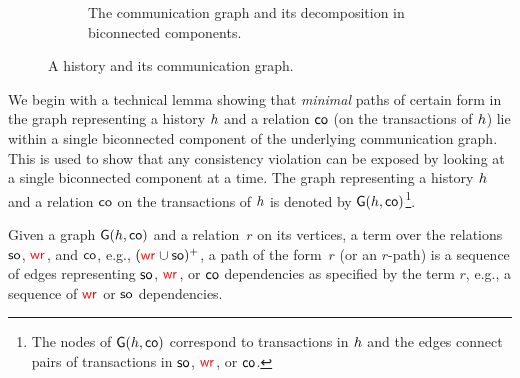 \begin{figure}
\begin{subfigure}{.4\textwidth}
{\begin{tikzpicture}[->,>=stealth',shorten >=1pt,auto,node distance=3cm,
     semithick, transform shape]
  
  \end{tikzpicture}  
    }
     \caption{The communication graph and its decomposition in biconnected components.}
     \label{comm_graph_example:2}
    \end{subfigure}
    
  \caption{A history and its communication graph.}
  \label{comm_graph_example}
\end{figure}


We begin with a technical lemma showing that \emph{minimal} paths of certain form in the graph representing a history $\hist$ and a relation $\co$ (on the transactions of $\hist$) 
lie within a single biconnected component of the underlying communication graph. This is used to show that any consistency violation can be exposed by looking at a single biconnected component at a time. The graph representing a history $\hist$ and a relation $\co$ on the transactions of $\hist$ is denoted by $\mathsf{G}(\hist,\co)$\footnote{The nodes of $\mathsf{G}(\hist,\co)$ correspond to transactions in $\hist$ and the edges connect pairs of transactions in $\so$, $\wro$, or $\co$.}.

Given a graph $\mathsf{G}(\hist,\co)$ and a relation~$r$ on its vertices, a term over the relations $\so$, $\wro$, and $\co$, e.g., $(\wro \cup \so)^+$, a path of the form~$r$ (or an $r$-path) is a sequence of edges representing $\so$, $\wro$, or $\co$ dependencies as specified by the term $r$, e.g., a sequence of $\wro$ or $\so$ dependencies.

